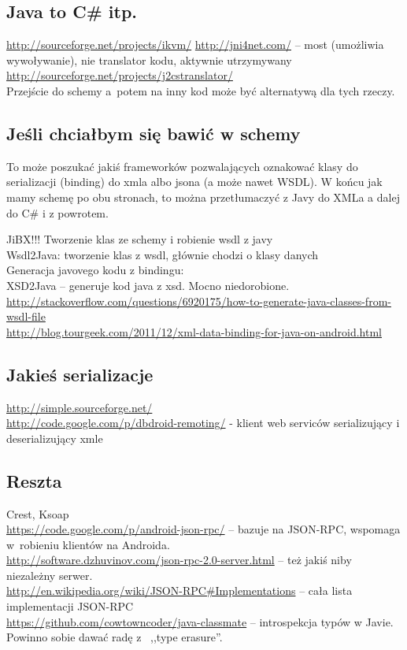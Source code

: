 \subsection{Java to C\# itp.}
\url{http://sourceforge.net/projects/ikvm/}
\url{http://jni4net.com/} -- most (umożliwia wywoływanie), nie translator kodu, aktywnie utrzymywany \\
\url{http://sourceforge.net/projects/j2cstranslator/}\\
Przejście do schemy a~potem na inny kod może być alternatywą dla tych rzeczy.


\subsection{Jeśli chciałbym się bawić w schemy}
To może poszukać jakiś frameworków pozwalających oznakować klasy do serializacji (binding) do xmla albo jsona (a może nawet WSDL).
W końcu jak mamy schemę po obu stronach, to można przetłumaczyć z Javy do XMLa a dalej do C\# i z powrotem.

JiBX!!! Tworzenie klas ze schemy i robienie wsdl z javy\\
Wsdl2Java: tworzenie klas z wsdl, głównie chodzi o klasy danych\\

Generacja javovego kodu z bindingu:\\
XSD2Java – generuje kod java z xsd. Mocno niedorobione.\\

\url{http://stackoverflow.com/questions/6920175/how-to-generate-java-classes-from-wsdl-file}\\
\url{http://blog.tourgeek.com/2011/12/xml-data-binding-for-java-on-android.html}\\

\subsection{Jakieś serializacje}
\url{http://simple.sourceforge.net/}\\
\url{http://code.google.com/p/dbdroid-remoting/} - klient web serviców serializujący i deserializujący xmle\\


\subsection{Reszta}
Crest, Ksoap \\
\url{https://code.google.com/p/android-json-rpc/} -- bazuje na JSON-RPC, wspomaga w~robieniu klientów na Androida.\\
\url{http://software.dzhuvinov.com/json-rpc-2.0-server.html} -- też jakiś niby niezależny serwer. \\ 
\url{http://en.wikipedia.org/wiki/JSON-RPC#Implementations} -- cała lista implementacji JSON-RPC \\
\url{https://github.com/cowtowncoder/java-classmate} -- introspekcja typów w Javie. Powinno sobie dawać radę z~ ,,type erasure''.


